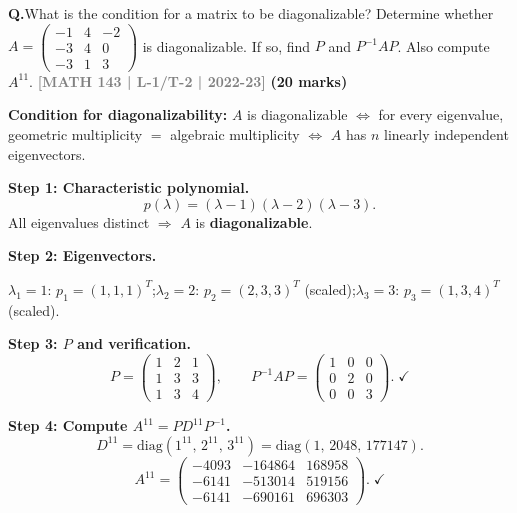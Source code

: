 \documentclass[12pt,a3paper]{article}
\newcommand{\yr}[1]{\hfill\textcolor{gray}{\small\textbf{[#1]}}}
\newcommand{\mk}[1]{\textcolor{orange!70!black}{\small\textbf{(#1 marks)}}}
\newcounter{qnum}
\newcommand{\Q}[1]{%
  \needspace{4\baselineskip}
  \refstepcounter{qnum}
  \vspace{6pt}
  \noindent\textbf{Q\theqnum.}\enspace #1\par
}
\begin{document}
\Q{What is the condition for a matrix to be diagonalizable? Determine whether $A = \begin{pmatrix} -1 & 4 & -2 \\ -3 & 4 & 0 \\ -3 & 1 & 3 \end{pmatrix}$ is diagonalizable. If so, find $P$ and $P^{-1}AP$. Also compute $A^{11}$.
\yr{MATH 143 | L-1/T-2 | 2022-23} \mk{20}}

\begin{tcolorbox}[enhanced,breakable,
  colback=cE!4,colframe=cE,boxrule=0.8pt,arc=5pt,
  title={\textbf{Answer --- Diagonalizability, $P$, $P^{-1}AP$, and $A^{11}$}},
  fonttitle=\bfseries\color{white},colbacktitle=cE]

\textbf{Condition for diagonalizability:} $A$ is diagonalizable $\Leftrightarrow$ for every eigenvalue, geometric multiplicity $=$ algebraic multiplicity $\Leftrightarrow$ $A$ has $n$ linearly independent eigenvectors.

\medskip
\textbf{Step 1: Characteristic polynomial.}
\[
p(\lambda)=(\lambda-1)(\lambda-2)(\lambda-3).
\]
All eigenvalues distinct $\Rightarrow$ $A$ is \textbf{diagonalizable}.

\textbf{Step 2: Eigenvectors.}

$\lambda_1=1$: $p_1=(1,1,1)^T$;\quad $\lambda_2=2$: $p_2=(2,3,3)^T$ (scaled);\quad $\lambda_3=3$: $p_3=(1,3,4)^T$ (scaled).

\textbf{Step 3: $P$ and verification.}
\[
P=\begin{pmatrix}1&2&1\\1&3&3\\1&3&4\end{pmatrix},\qquad
P^{-1}AP=\begin{pmatrix}1&0&0\\0&2&0\\0&0&3\end{pmatrix}.\;\checkmark
\]

\textbf{Step 4: Compute $A^{11}=PD^{11}P^{-1}$.}
\[
D^{11}=\mathrm{diag}(1^{11},\,2^{11},\,3^{11})=\mathrm{diag}(1,\,2048,\,177147).
\]
\[
A^{11}=\begin{pmatrix}-4093&-164864&168958\\-6141&-513014&519156\\-6141&-690161&696303\end{pmatrix}.\;\checkmark
\]

\end{tcolorbox}
\end{document}
